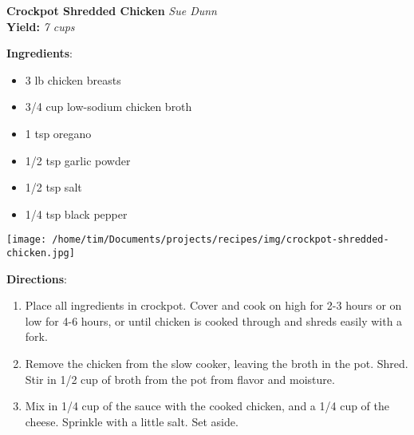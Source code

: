 \documentclass[11pt, twoside, openany]{book}
\begin{document}
\noindent\begin{minipage}[t]{\linewidth}%
{\Large\textbf{Crockpot Shredded Chicken}} \label{crockpot-shredded-chicken}\hfill\textit{Sue Dunn}\\
\textbf{Yield:} \textit{7 cups}\\
\noindent\begin{minipage}[t]{0.78\linewidth}%
\textbf{Ingredients}:\vspace{-3mm}
\begin{multicols}{2}
\begin{itemize}\setlength\itemsep{-1mm}
\item 3 lb chicken breasts
\item 3/4 cup low-sodium chicken broth
\item 1 tsp oregano
\item 1/2 tsp garlic powder
\item 1/2 tsp salt
\item 1/4 tsp black pepper
\end{itemize}
\end{multicols}
\end{minipage}
\noindent\begin{minipage}[t]{0.18\linewidth}
\centering \strut\vspace*{-\baselineskip}\newline
\texttt{[image: /home/tim/Documents/projects/recipes/img/crockpot-shredded-chicken.jpg]}\\
\end{minipage}\vspace{3mm}
\textbf{Directions}:
\vspace{-3mm}\begin{enumerate}\setlength\itemsep{-1mm}
\item Place all ingredients in crockpot. Cover and cook on high for 2-3 hours or on low for 4-6 hours, or until chicken is cooked through and shreds easily with a fork.
\item Remove the chicken from the slow cooker, leaving the broth in the pot. Shred. Stir in 1/2 cup of broth from the pot from flavor and moisture.
\item Mix in 1/4 cup of the sauce with the cooked chicken, and a 1/4 cup of the cheese. Sprinkle with a little salt. Set aside.
\end{enumerate}
\end{minipage}\vspace{8mm}
\end{document}
